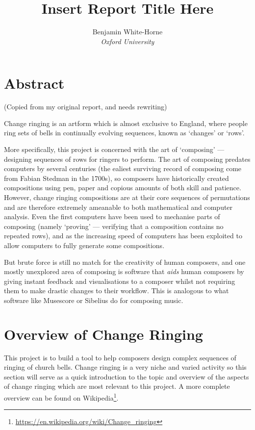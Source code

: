 \documentclass[12pt]{article}
\title{Insert Report Title Here}
\author{Benjamin White-Horne \\ \emph{Oxford University}}
\newcommand{\footurl}[1]{\footnote{\url{#1}}}
\begin{document}
\maketitle



\pagebreak

\tableofcontents



\pagebreak

\section{Abstract}

(Copied from my original report, and needs rewriting)

Change ringing is an artform which is almost exclusive to England, where people ring sets of bells
in continually evolving sequences, known as `changes' or `rows'.

More specifically, this project is concerned with the art of `composing' --- designing sequences of
rows for ringers to perform.  The art of composing predates computers by several centuries (the
ealiest surviving record of composing come from Fabian Stedman in the 1700s), so composers have
historically created compositions using pen, paper and copious amounts of both skill and patience.
However, change ringing compositions are at their core sequences of permutations and are therefore
extremely ameanable to both mathematical and computer analysis.  Even the first computers have been
used to mechanise parts of composing (namely `proving' --- verifying that a composition contains no
repeated rows), and as the increasing speed of computers has been exploited to allow computers to
fully generate some compositions.

But brute force is still no match for the creativity of human composers, and one mostly unexplored area
of composing is software that \emph{aids} human composers by giving instant feedback and
visualisations to a composer whilst not requiring them to make drastic changes to their workflow.
This is analogous to what software like Musescore or Sibelius do for composing music.



\pagebreak

\section{Overview of Change Ringing}

This project is to build a tool to help composers design complex sequences of ringing of church
bells.  Change ringing is a very niche and varied activity so this section will serve as a quick
introduction to the topic and overview of the aspects of change ringing which are most relevant to
this project.  A more complete overview can be found
on Wikipedia\footurl{https://en.wikipedia.org/wiki/Change_ringing}.
\end{document}
